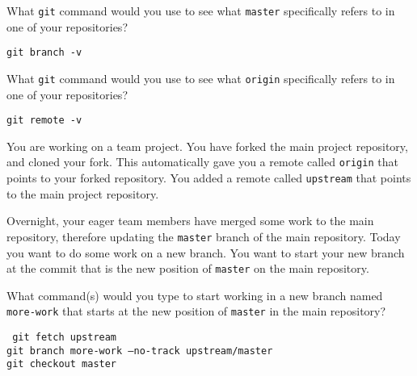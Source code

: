 \documentclass[10pt]{examdesign}
\begin{document}
\begin{shortanswer}[title={Short Answer},
                    rearrange=no,resetcounter=no]
\begin{block}[questions=3]
\begin{question}
  What \texttt{git} command would you use to see what \texttt{master}
  specifically refers to in one of your repositories?
  \vspace{5mm}
  \begin{answer}
    \texttt{git branch -v}
  \end{answer}
\end{question}

\begin{question}
  What \texttt{git} command would you use to see what \texttt{origin}
  specifically refers to in one of your repositories?
  \vspace{5mm}
  \begin{answer}
    \texttt{git remote -v}
  \end{answer}
\end{question}
\end{block}

\begin{block}[questions=1]

You are working on a team project.  You have forked the main project
repository, and cloned your fork.  This automatically gave you a remote called
\texttt{origin} that points to your forked repository.  You added a remote
called \texttt{upstream} that points to the main project repository.

Overnight, your eager team members have merged some work to the main
repository, therefore updating the \texttt{master} branch of the main
repository.  Today you want to do some work on a new branch.  You want to start
your new branch at the commit that is the new position of \texttt{master} on
the main repository.

\begin{question}

    What command(s) would you type to start working in a new branch named
    \texttt{more-work} that starts at the new position of \texttt{master} in
    the main repository?

    \vspace{80mm}
    \begin{answer}
        \texttt{
            git fetch upstream \\
            git branch more-work --no-track upstream/master \\
            git checkout master
        }
    \end{answer}

\end{question}


\end{block}
\end{shortanswer}
\end{document}
